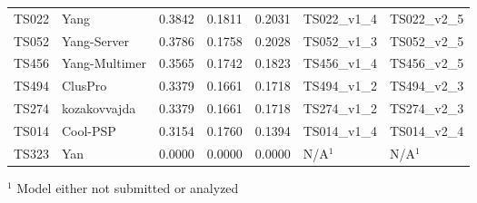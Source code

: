 \begin{table}[ht]
{\begin{tabular}{llrrrll}
TS022 & Yang & 0.3842 & 0.1811 & 0.2031 & TS022\_v1\_4 & TS022\_v2\_5 \\ 
TS052 & Yang-Server & 0.3786 & 0.1758 & 0.2028 & TS052\_v1\_3 & TS052\_v2\_5 \\ 
TS456 & Yang-Multimer & 0.3565 & 0.1742 & 0.1823 & TS456\_v1\_4 & TS456\_v2\_5 \\ 
TS494 & ClusPro & 0.3379 & 0.1661 & 0.1718 & TS494\_v1\_2 & TS494\_v2\_3 \\ 
TS274 & kozakovvajda & 0.3379 & 0.1661 & 0.1718 & TS274\_v1\_2 & TS274\_v2\_3 \\ 
TS014 & Cool-PSP & 0.3154 & 0.1760 & 0.1394 & TS014\_v1\_4 & TS014\_v2\_4 \\ 
TS323 & Yan & 0.0000 & 0.0000 & 0.0000 & N/A$^{1}$ & N/A$^{1}$ \\ 
\bottomrule
\end{tabular}%
}
\begin{flushleft}\footnotesize $^{1}$ Model either not submitted or analyzed\end{flushleft}
\end{table}
